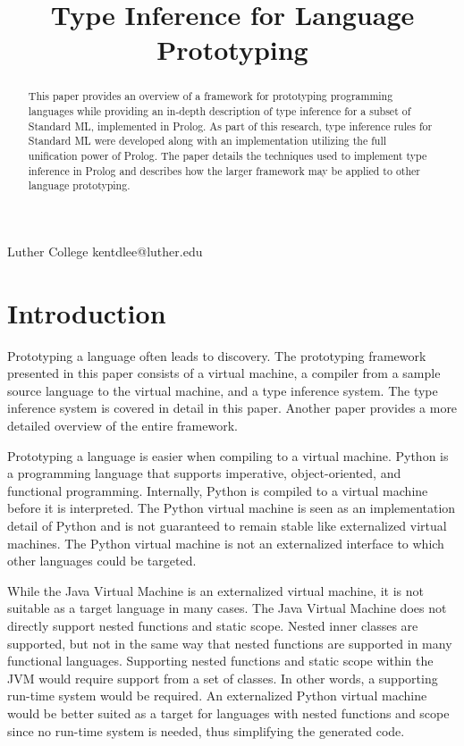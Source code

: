 \documentclass[10pt]{luthercs}
\begin{document}
\setlength{\pdfpageheight}{\paperheight}
\setlength{\pdfpagewidth}{\paperwidth}

\title{Type Inference for Language Prototyping}

           {Luther College}
           {kentdlee@luther.edu}

\maketitle

\begin{abstract}
This paper provides an overview of a framework for prototyping programming languages while providing an in-depth description of type inference for a subset of Standard ML, implemented in Prolog. As part of this research, type inference rules for Standard ML were developed along with an implementation utilizing the full unification power of Prolog. The paper details the techniques used to implement type inference in Prolog and describes how the larger framework may be applied to other language prototyping.  

\end{abstract}

\section{Introduction}

Prototyping a language often leads to discovery. The prototyping framework presented in this paper consists of a virtual machine, a compiler from a sample source language to the virtual machine, and a type inference system. The type inference system is covered in detail in this paper. Another paper \cite{Lee15} provides a more detailed overview of the entire framework.

Prototyping a language is easier when compiling to a virtual machine. Python is a programming language that supports imperative, object-oriented, and functional programming. Internally, Python is compiled to a virtual machine before it is interpreted. The Python virtual machine is seen as an implementation detail of Python and is not guaranteed to remain stable like externalized virtual machines. The Python virtual machine is not an externalized interface to which other languages could be targeted. 

While the Java Virtual Machine is an externalized virtual machine, it is not suitable as a target language in many cases. The Java Virtual Machine does not directly support nested functions and static scope. Nested inner classes are supported, but not in the same way that nested functions are supported in many functional languages. Supporting nested functions and static scope within the JVM would require support from a set of classes. In other words, a supporting run-time system would be required. An externalized Python virtual machine would be better suited as a target for languages with nested functions and scope since no run-time system is needed, thus simplifying the generated code.
\end{document}
